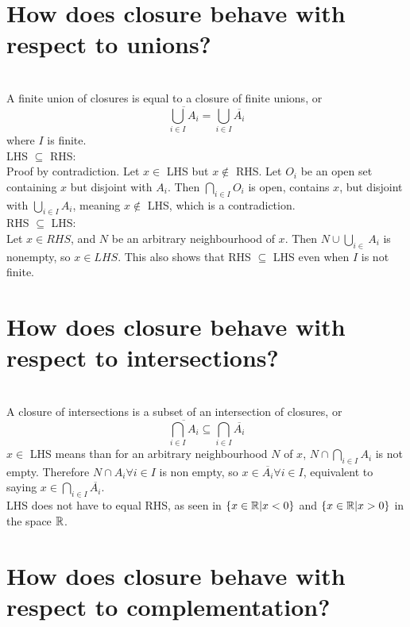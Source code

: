 
\begin{parts}
 \part{How does closure behave with respect to unions?}
 
 
\begin{solution}
  \\A finite union of closures is equal to a closure of finite unions, or
 $$\overline{\bigcup_{i \in I} A_i} = \bigcup_{i \in I} \overline{A_i}$$
 where $I$ is finite. \\
 LHS $\subseteq$ RHS: \\
 Proof by contradiction. Let $x \in$ LHS but $x \notin$ RHS. Let $O_i$ be an open set containing $x$ but disjoint with $A_i$. Then $\bigcap_{i \in I} O_i$ is open, contains $x$, but disjoint with $\bigcup_{i \in I} A_i$, meaning $x \notin$ LHS, which is a contradiction. \\
 RHS $\subseteq$ LHS: \\
 Let $x \in RHS$, and $N$ be an arbitrary neighbourhood of $x$. Then $N \cup \bigcup_{i \in } A_i$ is nonempty, so $x \in LHS$. This also shows that RHS $\subseteq$ LHS even when $I$ is not finite.
\end{solution}

 \part{How does closure behave with respect to intersections?}
 
\begin{solution}
 \\A closure of intersections is a subset of an intersection of closures, or
 $$\overline{\bigcap_{i \in I} A_i} \subseteq \bigcap_{i \in I} \overline{A_i}$$
 $x \in$ LHS means than for an arbitrary neighbourhood $N$ of $x$, $N \cap \bigcap_{i \in I} A_i$ is not empty. Therefore $N \cap A_i \forall i \in I$ is non empty, so $x \in \overline{A_i} \forall i \in I$, equivalent to saying $x \in \bigcap_{i \in I} \overline{A_i}$. \\
 LHS does not have to equal RHS, as seen in $\{x \in \mathbb{R}| x < 0\}$ and $\{x \in \mathbb{R}| x > 0\}$ in the space $\mathbb{R}$.
\end{solution}
 \part{How does closure behave with respect to complementation?}
  

\end{parts}
